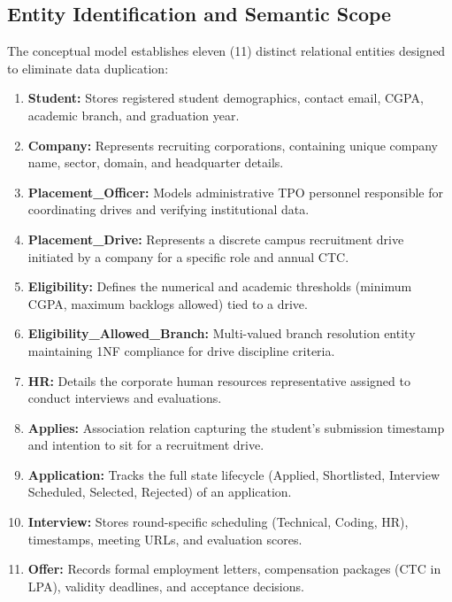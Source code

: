 \documentclass[11pt,a4paper]{article}
\begin{document}
\subsection{Entity Identification and Semantic Scope}
The conceptual model establishes eleven (11) distinct relational entities designed to eliminate data duplication:
\begin{enumerate}[label=\textbf{\arabic*.}]
    \item \textbf{Student:} Stores registered student demographics, contact email, CGPA, academic branch, and graduation year.
    \item \textbf{Company:} Represents recruiting corporations, containing unique company name, sector, domain, and headquarter details.
    \item \textbf{Placement\_Officer:} Models administrative TPO personnel responsible for coordinating drives and verifying institutional data.
    \item \textbf{Placement\_Drive:} Represents a discrete campus recruitment drive initiated by a company for a specific role and annual CTC.
    \item \textbf{Eligibility:} Defines the numerical and academic thresholds (minimum CGPA, maximum backlogs allowed) tied to a drive.
    \item \textbf{Eligibility\_Allowed\_Branch:} Multi-valued branch resolution entity maintaining 1NF compliance for drive discipline criteria.
    \item \textbf{HR:} Details the corporate human resources representative assigned to conduct interviews and evaluations.
    \item \textbf{Applies:} Association relation capturing the student's submission timestamp and intention to sit for a recruitment drive.
    \item \textbf{Application:} Tracks the full state lifecycle (Applied, Shortlisted, Interview Scheduled, Selected, Rejected) of an application.
    \item \textbf{Interview:} Stores round-specific scheduling (Technical, Coding, HR), timestamps, meeting URLs, and evaluation scores.
    \item \textbf{Offer:} Records formal employment letters, compensation packages (CTC in LPA), validity deadlines, and acceptance decisions.
\end{enumerate}
\end{document}

